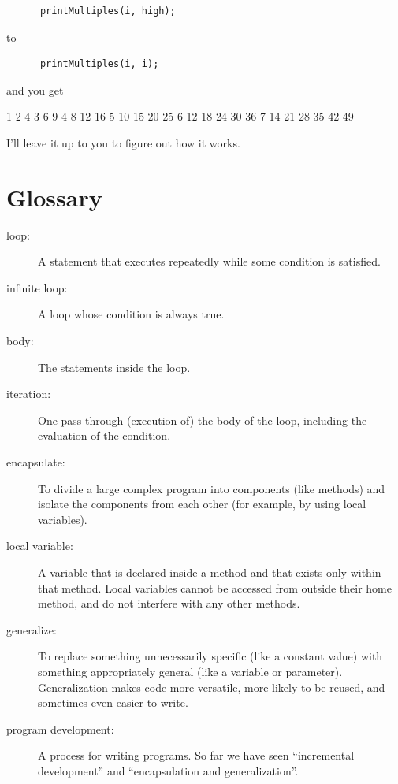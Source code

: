\begin{lstlisting}
      printMultiples(i, high);
\end{lstlisting}
%
to

\begin{lstlisting}
      printMultiples(i, i);
\end{lstlisting}
%
and you get

\begin{stdout}
1
2   4
3   6   9
4   8   12   16
5   10   15   20   25
6   12   18   24   30   36
7   14   21   28   35   42   49
\end{stdout}
%
I'll leave it up to you to figure out how it works.


\section{Glossary}

\begin{description}

\item[loop:]  A statement that executes repeatedly while
some condition is satisfied.

\item[infinite loop:]  A loop whose condition is always true.

\item[body:]  The statements inside the loop.

\item[iteration:]  One pass through (execution of) the body
of the loop, including the evaluation of the condition.

\item[encapsulate:]  To divide a large complex program into
components (like methods) and isolate the components from
each other (for example, by using local variables).

\item[local variable:]  A variable that is declared inside
a method and that exists only within that method.  Local variables
cannot be accessed from outside their home method, and do not
interfere with any other methods.

\item[generalize:]  To replace something unnecessarily specific
(like a constant value) with something appropriately general
(like a variable or parameter).  Generalization makes code more
versatile, more likely to be reused, and sometimes even easier
to write.

\item[program development:] A process for writing programs.
  So far we have seen ``incremental development'' and ``encapsulation
  and generalization''.


\end{description}


